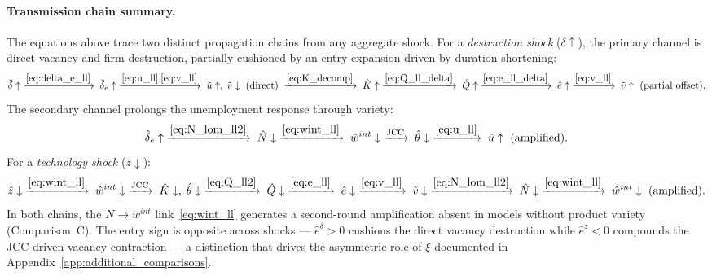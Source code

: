 \documentclass[authoryear, review, 12pt]{elsarticle}
\begin{document}
\paragraph{Transmission chain summary.}
The equations above trace two distinct propagation chains from any aggregate
shock.  For a \emph{destruction shock} ($\delta\uparrow$), the primary
channel is direct vacancy and firm destruction, partially cushioned by an
entry expansion driven by duration shortening:
\begin{equation*}
    \hat\delta\uparrow
    \;\xrightarrow{\eqref{eq:delta_e_ll}}\; \hat\delta_e\uparrow
    \;\xrightarrow{\eqref{eq:u_ll},\eqref{eq:v_ll}}\; \tilde{u}\uparrow,\;\tilde{v}\downarrow\;\text{(direct)}
    \;\xrightarrow{\eqref{eq:K_decomp}}\; \hat{K}\uparrow
    \;\xrightarrow{\eqref{eq:Q_ll_delta}}\; \hat{Q}\uparrow
    \;\xrightarrow{\eqref{eq:e_ll_delta}}\; \hat{e}\uparrow
    \;\xrightarrow{\eqref{eq:v_ll}}\; \tilde{v}\uparrow\text{ (partial offset)}.
\end{equation*}
The secondary channel prolongs the unemployment response through variety:
\begin{equation*}
    \hat\delta_e\uparrow
    \;\xrightarrow{\eqref{eq:N_lom_ll2}}\; \hat{N}\downarrow
    \;\xrightarrow{\eqref{eq:wint_ll}}\; \hat{w}^{int}\downarrow
    \;\xrightarrow{\text{JCC}}\; \hat\theta\downarrow
    \;\xrightarrow{\eqref{eq:u_ll}}\; \tilde{u}\uparrow\text{ (amplified)}.
\end{equation*}
For a \emph{technology shock} ($z\downarrow$):
\begin{equation*}
    \hat{z}\downarrow
    \;\xrightarrow{\eqref{eq:wint_ll}}\; \hat{w}^{int}\downarrow
    \;\xrightarrow{\text{JCC}}\; \hat{K}\downarrow,\;\hat\theta\downarrow
    \;\xrightarrow{\eqref{eq:Q_ll2}}\; \hat{Q}\downarrow
    \;\xrightarrow{\eqref{eq:e_ll}}\; \hat{e}\downarrow
    \;\xrightarrow{\eqref{eq:v_ll}}\; \tilde{v}\downarrow
    \;\xrightarrow{\eqref{eq:N_lom_ll2}}\; \hat{N}\downarrow
    \;\xrightarrow{\eqref{eq:wint_ll}}\; \hat{w}^{int}\downarrow\text{ (amplified)}.
\end{equation*}
In both chains, the $N\to w^{int}$ link~\eqref{eq:wint_ll} generates a
second-round amplification absent in models without product variety
(Comparison~C).  The entry sign is opposite across shocks ---
$\hat{e}^\delta>0$ cushions the direct vacancy destruction while
$\hat{e}^z<0$ compounds the JCC-driven vacancy contraction --- a
distinction that drives the asymmetric role of $\xi$ documented in
Appendix~\ref{app:additional_comparisons}.
\end{document}
